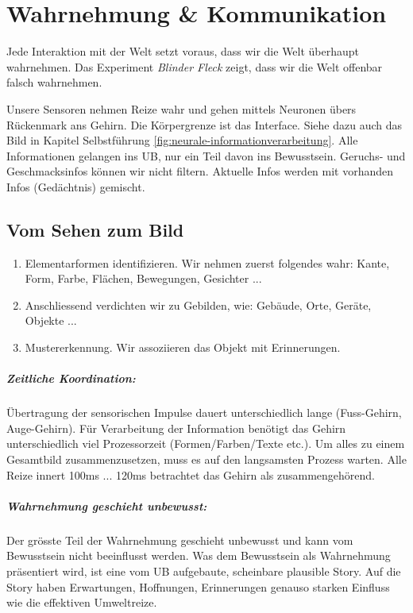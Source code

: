 \chapter{Wahrnehmung \& Kommunikation}

Jede Interaktion mit der Welt setzt voraus, dass wir die Welt überhaupt wahrnehmen. Das Experiment \textit{Blinder Fleck} zeigt, dass wir die Welt offenbar falsch wahrnehmen.

Unsere Sensoren nehmen Reize wahr und gehen mittels Neuronen übers Rückenmark ans Gehirn. Die Körpergrenze ist das Interface. Siehe dazu auch das Bild in Kapitel Selbstführung \ref{fig:neurale-informationverarbeitung}. Alle Informationen gelangen ins UB, nur ein Teil davon ins Bewusstsein. Geruchs- und Geschmacksinfos können wir nicht filtern. Aktuelle Infos werden mit vorhanden Infos (Gedächtnis) gemischt.

\section{Vom Sehen zum Bild}
\begin{enumerate}
	\item Elementarformen identifizieren. Wir nehmen zuerst folgendes wahr: Kante, Form, Farbe, Flächen, Bewegungen, Gesichter ...
	\item Anschliessend verdichten wir zu Gebilden, wie: Gebäude, Orte, Geräte, Objekte ...
	\item Mustererkennung. Wir assoziieren das Objekt mit Erinnerungen.
\end{enumerate}

\paragraph{Zeitliche Koordination:}
Übertragung der sensorischen Impulse dauert unterschiedlich lange (Fuss-Gehirn, Auge-Gehirn). Für Verarbeitung der Information benötigt das Gehirn unterschiedlich viel Prozessorzeit (Formen/Farben/Texte etc.). Um alles zu einem Gesamtbild zusammenzusetzen, muss es auf den langsamsten Prozess warten. Alle Reize innert 100ms ... 120ms betrachtet das Gehirn als zusammengehörend. 

\paragraph{Wahrnehmung geschieht unbewusst:}
Der grösste Teil der Wahrnehmung geschieht unbewusst und kann vom Bewusstsein nicht beeinflusst werden. Was dem Bewusstsein als Wahrnehmung präsentiert wird, ist eine vom UB aufgebaute, scheinbare plausible Story. Auf die Story haben Erwartungen, Hoffnungen, Erinnerungen genauso starken Einfluss wie die effektiven Umweltreize.

